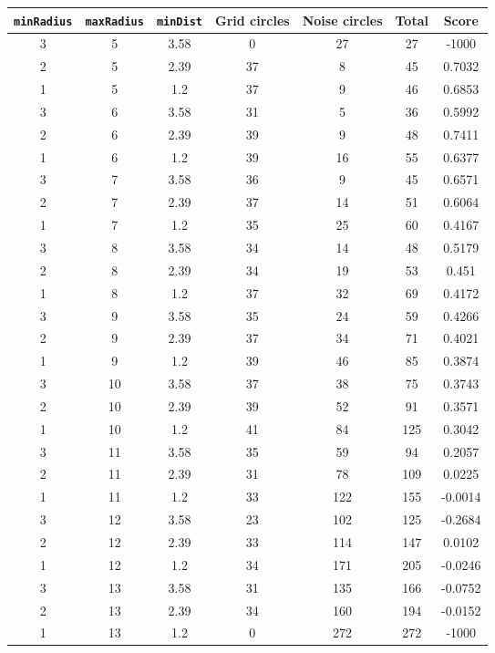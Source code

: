 \documentclass[letterpaper, 12pt]{article}
\begin{document}
\begin{longtable}{|c|c|c|c|c|c|c|}
\hline
\textbf{\texttt{minRadius}} & \textbf{\texttt{maxRadius}} & \textbf{\texttt{minDist}} & \textbf{Grid circles} & \textbf{Noise circles} & \textbf{Total} & \textbf{Score} \\
\hline
3 & 5 & 3.58 & 0 & 27 & 27 & -1000 \\
\hline
2 & 5 & 2.39 & 37 & 8 & 45 & 0.7032 \\
\hline
1 & 5 & 1.2 & 37 & 9 & 46 & 0.6853 \\
\hline
3 & 6 & 3.58 & 31 & 5 & 36 & 0.5992 \\
\hline
2 & 6 & 2.39 & 39 & 9 & 48 & 0.7411 \\
\hline
1 & 6 & 1.2 & 39 & 16 & 55 & 0.6377 \\
\hline
3 & 7 & 3.58 & 36 & 9 & 45 & 0.6571 \\
\hline
2 & 7 & 2.39 & 37 & 14 & 51 & 0.6064 \\
\hline
1 & 7 & 1.2 & 35 & 25 & 60 & 0.4167 \\
\hline
3 & 8 & 3.58 & 34 & 14 & 48 & 0.5179 \\
\hline
2 & 8 & 2.39 & 34 & 19 & 53 & 0.451 \\
\hline
1 & 8 & 1.2 & 37 & 32 & 69 & 0.4172 \\
\hline
3 & 9 & 3.58 & 35 & 24 & 59 & 0.4266 \\
\hline
2 & 9 & 2.39 & 37 & 34 & 71 & 0.4021 \\
\hline
1 & 9 & 1.2 & 39 & 46 & 85 & 0.3874 \\
\hline
3 & 10 & 3.58 & 37 & 38 & 75 & 0.3743 \\
\hline
2 & 10 & 2.39 & 39 & 52 & 91 & 0.3571 \\
\hline
1 & 10 & 1.2 & 41 & 84 & 125 & 0.3042 \\
\hline
3 & 11 & 3.58 & 35 & 59 & 94 & 0.2057 \\
\hline
2 & 11 & 2.39 & 31 & 78 & 109 & 0.0225 \\
\hline
1 & 11 & 1.2 & 33 & 122 & 155 & -0.0014 \\
\hline
3 & 12 & 3.58 & 23 & 102 & 125 & -0.2684 \\
\hline
2 & 12 & 2.39 & 33 & 114 & 147 & 0.0102 \\
\hline
1 & 12 & 1.2 & 34 & 171 & 205 & -0.0246 \\
\hline
3 & 13 & 3.58 & 31 & 135 & 166 & -0.0752 \\
\hline
2 & 13 & 2.39 & 34 & 160 & 194 & -0.0152 \\
\hline
1 & 13 & 1.2 & 0 & 272 & 272 & -1000 \\

\end{longtable}
\end{document}
